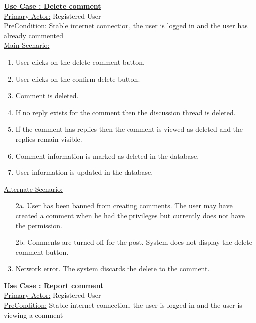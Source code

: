 \documentclass[conference,compsoc]{IEEEtran}
\newcounter{UC}
\newcommand{\nextU}{\stepcounter{UC}\theUC}
\begin{document}
\underline{\textbf{Use Case \nextU: Delete comment}}\\

\underline{Primary Actor:} Registered User\\

\underline{PreCondition:} Stable internet connection, the user is logged in and the user has already commented\\

\underline{Main Scenario:}\\

\begin{enumerate}
    \item User clicks on the delete comment button.
    \item User clicks on the confirm delete button.
    \item Comment is deleted.
    \item If no reply exists for the comment then the discussion thread is deleted.
    \item If the comment has replies then the comment is viewed as deleted and the replies remain visible.
    \item Comment information is marked as deleted in the database.
    \item User information is updated in the database.
\end{enumerate}

\underline{Alternate Scenario:}\\
\begin{enumerate}
    \item [2a.] User has been banned from creating comments. The user may have created a comment when he had the privileges but currently does not have the permission.
    \item [2b.] Comments are turned off for the post. System does not display the delete comment button.
    \item Network error. The system discards the delete to the comment.
\end{enumerate}

\underline{\textbf{Use Case \nextU: Report comment}}\\

\underline{Primary Actor:} Registered User\\

\underline{PreCondition:} Stable internet connection, the user is logged in and the user is viewing a comment\\
\end{document}
